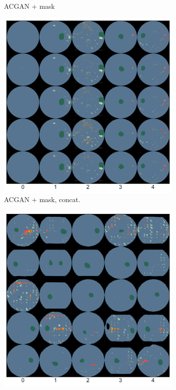 \begin{figure}[h]
\begin{subfigure}{0.31\textwidth}
        \caption{ACGAN + mask}
        \label{fig:acgan_sample_2}
    \end{subfigure}
    \begin{subfigure}{0.31\textwidth}
        \centering
        \includegraphics[width=\linewidth]{labels/figs/acgan_concat_sample.pdf}
        \caption{ACGAN + mask, concat.}
        \label{fig:acgan_sample_3}
    \end{subfigure}
    \begin{subfigure}{0.31\textwidth}
        \centering
        \includegraphics[width=\linewidth]{labels/figs/progan_sample.pdf}

\end{subfigure}
\end{figure}
